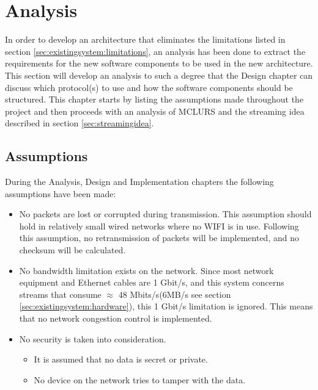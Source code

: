 \chapter{Analysis} \label{chp:analysis}
In order to develop an architecture that eliminates the limitations listed in section \ref{sec:existingsystem:limitations}, an analysis has been done to extract the requirements for the new software components to be used in the new architecture.
This section will develop an analysis to such a degree that the Design chapter can discuss which protocol(s) to use and how the software components should be structured. This chapter starts by listing the assumptions made throughout the project and then proceeds with an analysis of MCLURS and the streaming idea described in section \ref{sec:streamingidea}.



\section{Assumptions}
During the Analysis, Design and Implementation chapters the following assumptions have been made:
\begin{itemize}
	\item No packets are lost or corrupted during transmission. This assumption should hold in relatively small wired networks where no WIFI is in use. Following this assumption, no retransmission of packets will be implemented, and no checksum will be calculated.
	\item No bandwidth limitation exists on the network. Since most network equipment and Ethernet cables are 1 Gbit/s, and this system concerns streams that consume $\approx$ 48 Mbits/s(6MB/s see section \ref{sec:existingsystem:hardware}), this 1 Gbit/s limitation is ignored. This means that no network congestion control is implemented. 
	
	\item No security is taken into consideration.
		\begin{itemize}
			\item It is assumed that no data is secret or private.
			\item No device on the network tries to tamper with the data.
		\end{itemize}
\end{itemize}

